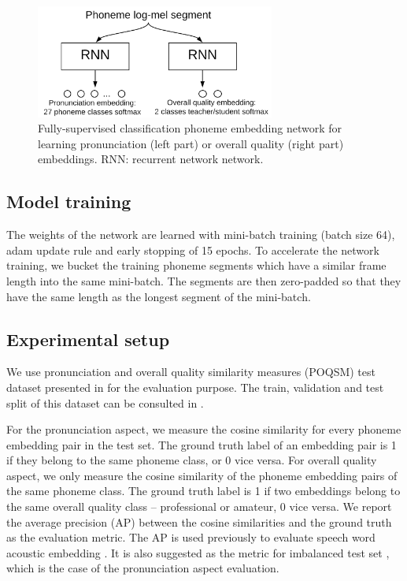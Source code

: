 \begin{figure}[ht!]
    \centering
    \includegraphics[width=0.7\textwidth]{figs/ch7/classification_net.png}
    \caption{Fully-supervised classification phoneme embedding network for learning pronunciation (left part) or overall quality (right part) embeddings. RNN: recurrent network network.}
    \label{fig:ch7:classification_net}
\end{figure}

\subsection{Model training}

The weights of the network are learned with mini-batch training (batch size 64), adam \cite{kingma2014adam} update rule and early stopping of 15 epochs. To accelerate the network training, we bucket the training phoneme segments which have a similar frame length into the same mini-batch. The segments are then zero-padded so that they have the same length as the longest segment of the mini-batch. 

\subsection{Experimental setup}\label{sec:ch7:experimental_setup_classification}

We use pronunciation and overall quality similarity measures (POQSM) test dataset presented in  for the evaluation purpose. The train, validation and test split of this dataset can be consulted in .

For the pronunciation aspect, we measure the cosine similarity for every phoneme embedding pair in the test set. The ground truth label of an embedding pair is 1 if they belong to the same phoneme class, or 0 vice versa. For overall quality aspect, we only measure the cosine similarity of the phoneme embedding pairs of the same phoneme class. The ground truth label is 1 if two embeddings belong to the same overall quality class -- professional or amateur, 0 vice versa. We report the average precision (AP) between the cosine similarities and the ground truth as the evaluation metric. The AP is used previously to evaluate speech word acoustic embedding \cite{Kampera,Settle2016a}. It is also suggested as the metric for imbalanced test set \cite{Davis2006}, which is the case of the pronunciation aspect evaluation.


